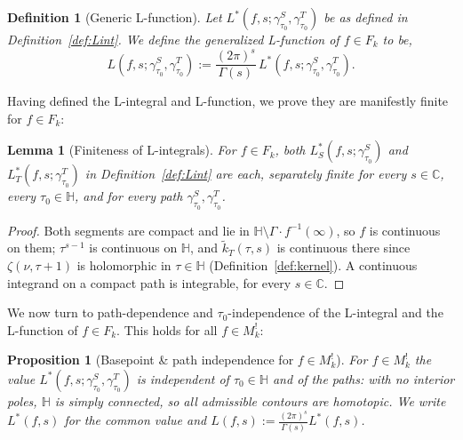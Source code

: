 \documentclass[11pt]{article}
\newtheorem{lemma}[theorem]{Lemma}
\newtheorem{proposition}[theorem]{Proposition}
\newtheorem{definition}[theorem]{Definition}
\newcommand{\HH}{\mathbb{H}}
\newcommand{\CC}{\mathbb{C}}
\newcommand{\tk}{\widetilde{k}_T}
\begin{document}
\begin{definition}[Generic L-function]\label{def:Lfun}
Let $L^*(f,s;\gamma^S_{\tau_0}, \gamma^T_{\tau_0})$ be as defined in Definition~\ref{def:Lint}. 
We define the generalized \emph{L-function} of $f\in F_k$ to be,
\begin{equation}
L(f,s;\gamma^S_{\tau_0},\gamma^T_{\tau_0})
:=\frac{(2\pi)^s}{\Gamma(s)}\,L^*(f,s;\gamma^S_{\tau_0},\gamma^T_{\tau_0}).
\end{equation}
\end{definition}

Having defined the L-integral and L-function, we prove they are manifestly finite for $f \in F_k$: 

\begin{lemma}[Finiteness of L-integrals]\label{lem:finite}
For $f\in F_k$, both $L^*_S(f, s; \gamma^S_{\tau_0})$ and 
$L^*_T(f, s; \gamma^T_{\tau_0})$ in Definition~\ref{def:Lint} are each, 
separately finite for every $s\in\CC$, every $\tau_0\in\HH$, and for 
every path $\gamma^S_{\tau_0},\gamma^T_{\tau_0}$.
\end{lemma}

\begin{proof}
Both segments are compact and lie in $\HH\setminus\Gamma\!\cdot\!f^{-1}(\infty)$, so $f$ is
continuous on them; $\tau^{s-1}$ is continuous on $\HH$, and $\tk(\tau,s)$ is continuous there
since $\zeta(\nu,\tau+1)$ is holomorphic in $\tau\in\HH$ (Definition~\ref{def:kernel}). A
continuous integrand on a compact path is integrable, for every $s\in\CC$.
\end{proof}

We now turn to path-dependence and $\tau_0$-independence of 
the L-integral and the L-function of $f \in F_k$. 
This holds for all $f \in M_k^!$:

\begin{proposition}[Basepoint \& path independence for $f \in M_k^!$]\label{prop:indep}
For $f\in M^!_k$ the value $L^*(f,s;\gamma^S_{\tau_0},\gamma^T_{\tau_0})$ is independent
of $\tau_0\in\HH$ and of the paths: with no interior poles, $\HH$ is simply connected,
so all admissible contours are homotopic. We write $L^*(f,s)$ for the common value and
$L(f,s):=\frac{(2\pi)^s}{\Gamma(s)}L^*(f,s)$.
\end{proposition}
\end{document}
